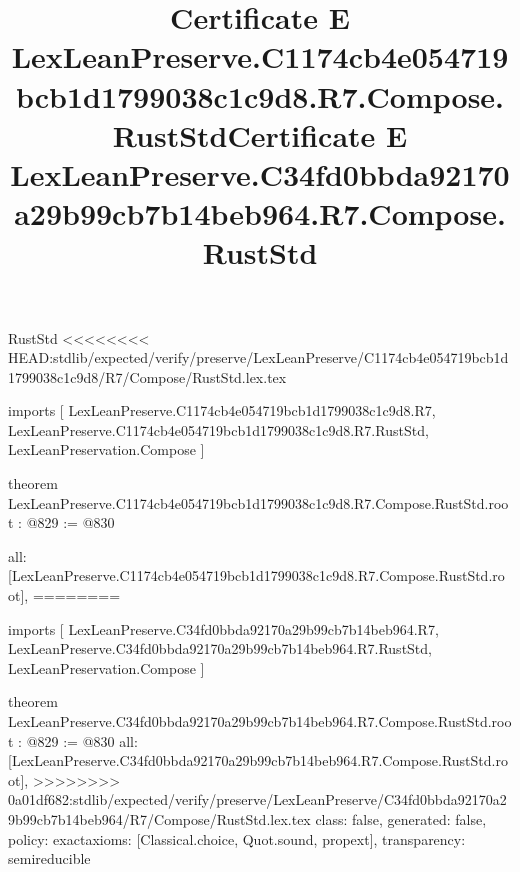 \begin{lexlean}{RustStd}
<<<<<<<< HEAD:stdlib/expected/verify/preserve/LexLeanPreserve/C1174cb4e054719bcb1d1799038c1c9d8/R7/Compose/RustStd.lex.tex
\title{Certificate E LexLeanPreserve.C1174cb4e054719bcb1d1799038c1c9d8.R7.Compose.RustStd}
\begin{coremodule}
imports [
  LexLeanPreserve.C1174cb4e054719bcb1d1799038c1c9d8.R7,
  LexLeanPreserve.C1174cb4e054719bcb1d1799038c1c9d8.R7.RustStd,
  LexLeanPreservation.Compose
]

theorem LexLeanPreserve.C1174cb4e054719bcb1d1799038c1c9d8.R7.Compose.RustStd.root : @829 := @830 {
  all: [LexLeanPreserve.C1174cb4e054719bcb1d1799038c1c9d8.R7.Compose.RustStd.root],
========
\title{Certificate E LexLeanPreserve.C34fd0bbda92170a29b99cb7b14beb964.R7.Compose.RustStd}
\begin{coremodule}
imports [
  LexLeanPreserve.C34fd0bbda92170a29b99cb7b14beb964.R7,
  LexLeanPreserve.C34fd0bbda92170a29b99cb7b14beb964.R7.RustStd,
  LexLeanPreservation.Compose
]

theorem LexLeanPreserve.C34fd0bbda92170a29b99cb7b14beb964.R7.Compose.RustStd.root : @829 := @830 {
  all: [LexLeanPreserve.C34fd0bbda92170a29b99cb7b14beb964.R7.Compose.RustStd.root],
>>>>>>>> 0a01df682:stdlib/expected/verify/preserve/LexLeanPreserve/C34fd0bbda92170a29b99cb7b14beb964/R7/Compose/RustStd.lex.tex
  class: false,
  generated: false,
  policy: exact{axioms: [Classical.choice, Quot.sound, propext]},
  transparency: semireducible
}


\end{coremodule}}
\end{coremodule}
\end{lexlean}
